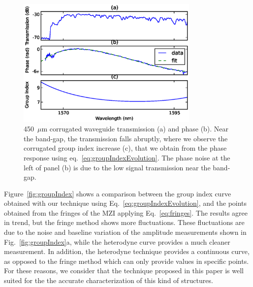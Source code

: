 \documentclass[journal]{IEEEtran}
\newcommand{\fwidthBig}{3.5in}
\begin{document}
\begin{figure}[htb]
  \centerline{\includegraphics[width=\fwidthBig]{corrAmpPhaseResponseGroupIndex}}
  \caption{450~$\mu$m corrugated waveguide transmission (a) and phase (b). Near the band-gap, the transmission falls abruptly, where we observe the corrugated group index increase (c), that we obtain from the phase response using eq.~\ref{eq:groupIndexEvolution}.
  The phase noise at the left of panel (b) is due to the low signal transmission near the band-gap.}  
  \label{fig:corr}
\end{figure}

Figure~\ref{fig:groupIndex} shows a comparison between the group index curve obtained with our technique using Eq.~\ref{eq:groupIndexEvolution}, and the points obtained from the fringes of the MZI applying Eq.~\ref{eq:fringes}.
The results agree in trend, but the fringe method shows more fluctuations. These fluctuations are due to the noise and baseline variation of the amplitude measurements shown in Fig.~\ref{fig:groupIndex}a, while the heterodyne curve provides a much cleaner measurement. In addition, the heterodyne technique provides a continuous curve, as opposed to the fringe method which can only provide values in specific points.
For these reasons, we consider that the technique proposed in this paper is well suited for the the accurate characterization of this kind of structures.
\end{document}
